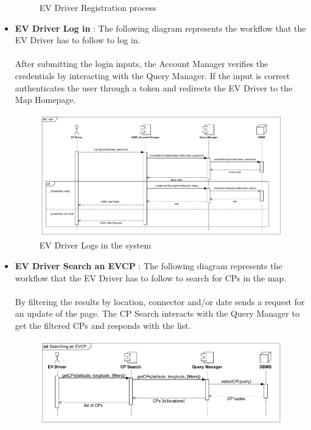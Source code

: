 \begin{itemize}
\begin{figure}[H]
              \caption{EV Driver Registration process}
          \end{figure}
          \pagebreak
    \item \textbf{EV Driver Log in} : The following diagram represents the workflow that the EV Driver has to follow to log in.\\
          \\After submitting the login inputs, the Account Manager verifies the credentials by interacting with the Query Manager. If
          the input is correct authenticates the user through a token and redirects the EV Driver to the Map Homepage.
          \begin{figure}[H]
              \centering
              \includegraphics[scale=0.60]{src/runtimeView/eMSP_Login.pdf}
              \caption{EV Driver Logs in the system}
          \end{figure}
    \item \textbf{EV Driver Search an EVCP} : The following diagram represents the workflow that the EV Driver has to follow to search for CPs in the map.\\
          \\By filtering the results by location, connector and/or date sends a request for an update of the page. The CP Search
          interacts with the Query Manager to get the filtered CPs and responds with the list.
          \begin{figure}[H]
              \centering
              \includegraphics[scale=0.60]{src/runtimeView/eMSP_Search.pdf}

\end{figure}
\end{itemize}
